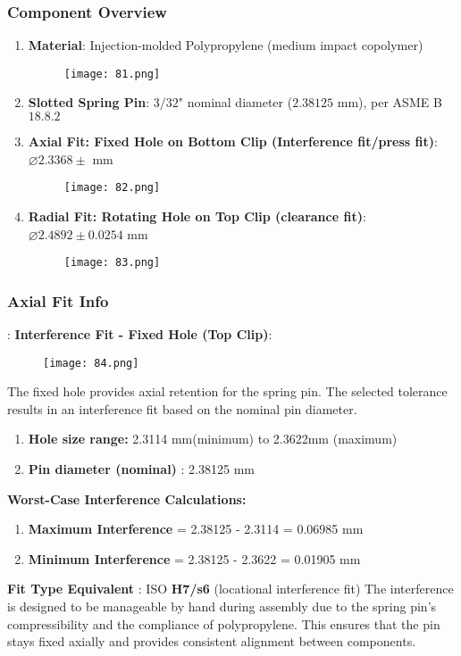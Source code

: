 \documentclass[12pt]{article}
\theoremstyle{definition} %
\theoremstyle{plain} %
\begin{document}
\subsubsection*{Component Overview}
\noindent
\begin{enumerate}
  \item \textbf{Material}: Injection-molded Polypropylene
  (medium impact copolymer)
  \begin{figure}[htbp]
    \centering
    \texttt{[image: 81.png]}
    \caption{}
    \label{fig:}
  \end{figure}
  \item \textbf{Slotted Spring Pin}: $3/32$" nominal diameter
  ($2.38125$ mm), per ASME B$18.8.2$ 

  \item \textbf{Axial Fit: Fixed Hole on Bottom Clip
  (Interference fit/press fit)}: $\varnothing 2.3368 \pm$ mm
  \begin{figure}[htbp]
    \centering
    \texttt{[image: 82.png]}
    \caption{}
    \label{fig:}
  \end{figure}
  \pagebreak
  \item \textbf{Radial Fit: Rotating Hole on Top Clip
  (clearance fit)}: $\varnothing 2.4892 \pm 0.0254$ mm  
  \begin{figure}[htbp]
    \centering
    \texttt{[image: 83.png]}
    \caption{}
    \label{fig:}
  \end{figure}
\end{enumerate}
\subsubsection*{Axial Fit Info}:
\textbf{Interference Fit - Fixed Hole (Top Clip)}:
\begin{figure}[htbp]
  \centering
  \texttt{[image: 84.png]}
  \caption{}
  \label{fig:}
\end{figure}
The fixed hole provides axial retention for the spring pin. The selected tolerance
results in an interference fit based on the nominal pin diameter.
\noindent
\begin{enumerate}
  \item \textbf{Hole size range:}  2.3114 mm(minimum) to 2.3622mm (maximum)
\item
\textbf{Pin diameter (nominal)} : 2.38125 mm
\end{enumerate}
\textbf{Worst-Case Interference Calculations:} 
\vspace{.5cm} 
\noindent
\begin{enumerate}
  \item \textbf{Maximum Interference}  = 2.38125 - 2.3114 = 0.06985 mm
  \item
  \textbf{Minimum Interference}  = 2.38125 - 2.3622 = 0.01905 mm
\end{enumerate}
\vspace{.5cm} 
\textbf{Fit Type Equivalent} : ISO \textbf{H7/s6}  (locational interference fit)
The interference is designed to be manageable by hand during assembly due to the
spring pin's compressibility and the compliance of polypropylene. This ensures that
the pin stays fixed axially and provides consistent alignment between components.
\pagebreak
\end{document}
